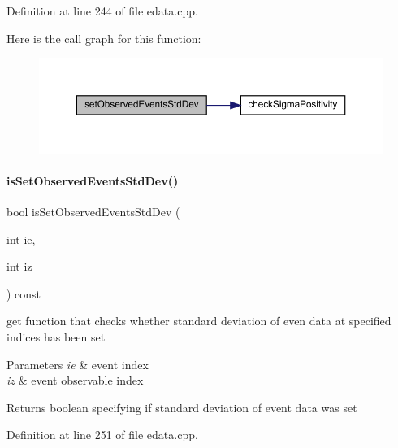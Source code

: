 Definition at line 244 of file edata.\+cpp.

Here is the call graph for this function\+:
\nopagebreak
\begin{figure}[H]
\begin{center}
\leavevmode
\includegraphics[width=350pt]{classamici_1_1_exp_data_a2533798d195c8ede07c783800adf1d82_cgraph}
\end{center}
\end{figure}
\mbox{\label{classamici_1_1_exp_data_a29530529cf50b9fa791e02fed620ea7a}} 
\paragraph{\texorpdfstring{is\+Set\+Observed\+Events\+Std\+Dev()}{isSetObservedEventsStdDev()}}
{\footnotesize\ttfamily bool is\+Set\+Observed\+Events\+Std\+Dev (\begin{DoxyParamCaption}\item[{int}]{ie,  }\item[{int}]{iz }\end{DoxyParamCaption}) const}

get function that checks whether standard deviation of even data at specified indices has been set


\begin{DoxyParams}{Parameters}
{\em ie} & event index \\
\hline
{\em iz} & event observable index \\
\hline
\end{DoxyParams}
\begin{DoxyReturn}{Returns}
boolean specifying if standard deviation of event data was set 
\end{DoxyReturn}


Definition at line 251 of file edata.\+cpp.


